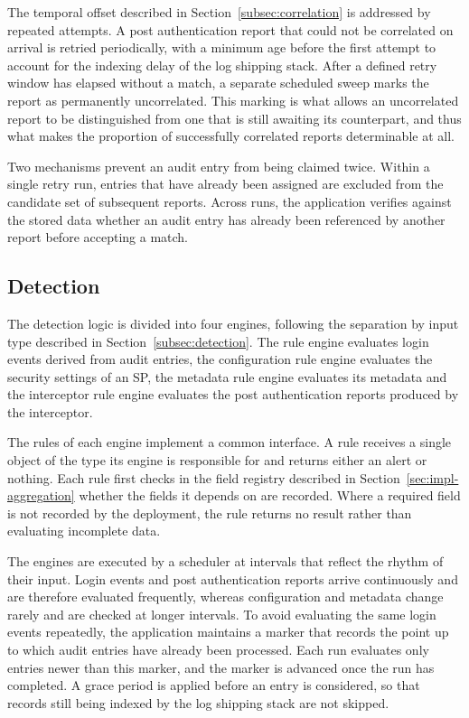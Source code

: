 \documentclass[../main.tex]{subfiles}
\begin{document}
The temporal offset described in Section~\ref{subsec:correlation} is addressed by repeated 
attempts. 
A post authentication report that could not be correlated on arrival is retried periodically, with a 
minimum age before the first attempt to account for the indexing delay of the log shipping stack. 
After a defined retry window has elapsed without a match, a separate scheduled sweep marks the 
report as permanently uncorrelated. 
This marking is what allows an uncorrelated report to be distinguished from one that is still 
awaiting its counterpart, and thus what makes the proportion of successfully correlated reports 
determinable at all.

Two mechanisms prevent an audit entry from being claimed twice. 
Within a single retry run, entries that have already been assigned are excluded from the candidate 
set of subsequent reports. 
Across runs, the application verifies against the stored data whether an audit entry has already 
been referenced by another report before accepting a match.

\subsection{Detection}\label{subsec:impl-detection}

The detection logic is divided into four engines, following the separation by input type 
described in Section~\ref{subsec:detection}. 
The rule engine evaluates login events derived from audit entries, the configuration rule 
engine evaluates the security settings of an SP, the metadata rule engine evaluates its 
metadata and the interceptor rule engine evaluates the post authentication reports produced 
by the interceptor. 

The rules of each engine implement a common interface. 
A rule receives a single object of the type its engine is responsible for and returns either 
an alert or nothing. 
Each rule first checks in the field registry described in Section~\ref{sec:impl-aggregation} 
whether the fields it depends on are recorded. 
Where a required field is not recorded by the deployment, the rule returns no result rather than 
evaluating incomplete data.

The engines are executed by a scheduler at intervals that reflect the rhythm of their input. 
Login events and post authentication reports arrive continuously and are therefore evaluated 
frequently, whereas configuration and metadata change rarely and are checked at longer 
intervals. 
To avoid evaluating the same login events repeatedly, the application maintains a marker that 
records the point up to which audit entries have already been processed. 
Each run evaluates only entries newer than this marker, and the marker is advanced once the run 
has completed. 
A grace period is applied before an entry is considered, so that records still being indexed by 
the log shipping stack are not skipped.
\end{document}
